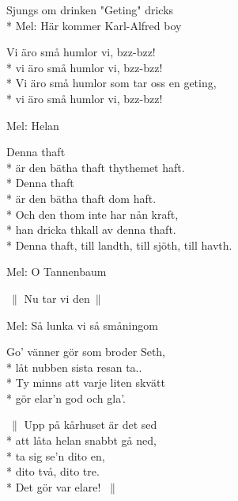\begin{SongText}[Humlorna]
    \begin{SongInfo}
        Sjungs om drinken "Geting" dricks\\*%
        Mel: Här kommer Karl-Alfred boy
    \end{SongInfo}
    \begin{SongVerse}
        Vi äro små humlor vi, bzz-bzz!\\*%
        vi äro små humlor vi, bzz-bzz!\\*%
        Vi äro små humlor som tar oss en geting,\\*%
        vi äro små humlor vi, bzz-bzz!
    \end{SongVerse}
\end{SongText}
\begin{SongText}
    \begin{SongInfo}
        Mel: Helan
    \end{SongInfo}
    \begin{SongVerse}
        Denna thaft\\*%
        är den bätha thaft thythemet haft.\\*%
        Denna thaft\\*%
        är den bätha thaft dom haft.\\*%
        Och den thom inte har nån kraft,\\*%
        han dricka thkall av denna thaft.\\*%
        Denna thaft, till landth, till sjöth, till havth.
    \end{SongVerse}
\end{SongText}
\begin{SongText}
    \begin{SongInfo}
        Mel: O Tannenbaum
    \end{SongInfo}
    \begin{SongVerse}
        $\:\|$ Nu tar vi den$\:\|$
    \end{SongVerse}
\end{SongText}
\begin{SongText}
    \begin{SongInfo}
        Mel: Så lunka vi så småningom
    \end{SongInfo}
    \begin{SongVerse}
        Go’ vänner gör som broder Seth,\\*%
        låt nubben sista resan ta..\\*%
        Ty minns att varje liten skvätt\\*%
        gör elar’n god och gla’.
    \end{SongVerse}
    \begin{SongVerse}
        $\:\|$ Upp på kårhuset är det sed\\*%
        att låta helan snabbt gå ned,\\*%
        ta sig se’n dito en,\\*%
        dito två, dito tre.\\*%
        Det gör var elare! $\:\|$
    \end{SongVerse}
\end{SongText}
